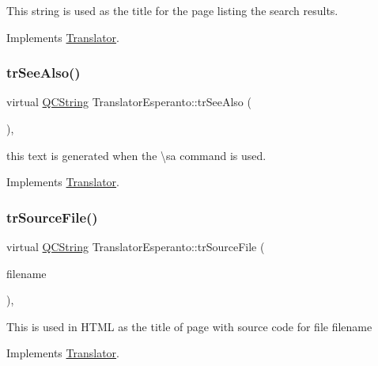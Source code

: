 This string is used as the title for the page listing the search results. 

Implements \mbox{\hyperlink{class_translator}{Translator}}.

\mbox{\label{class_translator_esperanto_a58153d1b8e5313cf38b8288b2616f0b2}} 
\subsubsection{\texorpdfstring{trSeeAlso()}{trSeeAlso()}}
{\footnotesize\ttfamily virtual \mbox{\hyperlink{class_q_c_string}{Q\+C\+String}} Translator\+Esperanto\+::tr\+See\+Also (\begin{DoxyParamCaption}{ }\end{DoxyParamCaption})\hspace{0.3cm}{\ttfamily [inline]}, {\ttfamily [virtual]}}

this text is generated when the \textbackslash{}sa command is used. 

Implements \mbox{\hyperlink{class_translator}{Translator}}.

\mbox{\label{class_translator_esperanto_a2ad5789d4a2b742a9c867c890f466f5d}} 
\subsubsection{\texorpdfstring{trSourceFile()}{trSourceFile()}}
{\footnotesize\ttfamily virtual \mbox{\hyperlink{class_q_c_string}{Q\+C\+String}} Translator\+Esperanto\+::tr\+Source\+File (\begin{DoxyParamCaption}\item[{\mbox{\hyperlink{class_q_c_string}{Q\+C\+String}} \&}]{filename }\end{DoxyParamCaption})\hspace{0.3cm}{\ttfamily [inline]}, {\ttfamily [virtual]}}

This is used in H\+T\+ML as the title of page with source code for file filename 

Implements \mbox{\hyperlink{class_translator}{Translator}}.

\mbox{\label{class_translator_esperanto_a1faa66dfea6d77be4503a698529dfde3}} 
